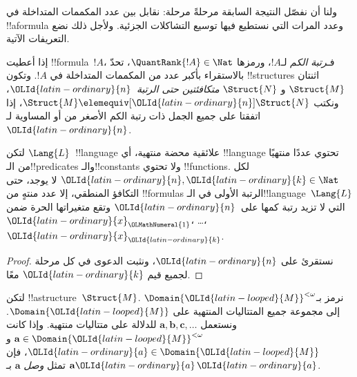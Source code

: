 \documentclass[../../../include/open-logic-section]{subfiles}
\begin{document}
ولنا أن نفصّل النتيجة السابقة مرحلةً مرحلة: نقابل بين عدد
المكممات المتداخلة في !!a{formula} وعدد المرات التي نستطيع فيها
توسيع التشاكلات الجزئية. ولأجل ذلك نضع التعريفات الآتية.

\begin{defn}
  إذا أعطيت !!{formula}~$!A$، فـ\emph{رتبة الكم} لـ$!A$، ورمزها
  $\QuantRank{!A} \in \Nat$، تحدّ بالاستقراء بأكبر عدد من المكممات
  المتداخلة في $!A$. وتكون !!{structure}s اثنتان $\Struct{M}$ و
  $\Struct{N}$ \emph{متكافئتين حتى الرتبة~${\OLId{latin-ordinary}{n}}$}، ونكتب
  $\Struct{M} \elemequiv[{\OLId{latin-ordinary}{n}}] \Struct{N}$، إذا اتفقتا على جميع الجمل ذات
  رتبة الكم الأصغر من أو المساوية لـ${\OLId{latin-ordinary}{n}}$.
\end{defn}

\begin{prop}
  لتكن $\Lang{L}$~!!{language} علائقية محضة منتهية، أي !!{language}
  تحتوي عددًا منتهيًا من الـ!!{predicate}s والـ!!{constant}s ولا تحتوي
  !!{function}s. لكل ${\OLId{latin-ordinary}{n}},{\OLId{latin-ordinary}{k}} \in \Nat$ لا يوجد، حتى التكافؤ المنطقي، إلا
  عدد منتهٍ من !!{formula}s الرتبة الأولى في الـ!!{language}~$\Lang{L}$ التي لا تزيد
  رتبة كمها على~${\OLId{latin-ordinary}{n}}$ وتقع متغيراتها الحرة ضمن ${\OLId{latin-ordinary}{x}}_{\OLMathNumeral{1}}$، \dots،~${\OLId{latin-ordinary}{x}}_{\OLId{latin-ordinary}{k}}$.
\end{prop}

\begin{proof}
  نستقرئ على ${\OLId{latin-ordinary}{n}}$، ونثبت الدعوى في كل مرحلة لجميع قيم ${\OLId{latin-ordinary}{k}}$ معًا.
\end{proof}

\begin{defn}
  لتكن !!a{structure}~$\Struct{M}$. نرمز بـ$\Domain {\OLId{latin-looped}{M}}^{<\omega}$ إلى
  مجموعة جميع المتتاليات المنتهية على $\Domain{{\OLId{latin-looped}{M}}}$. ونستعمل
  $\mathbf{a}, \mathbf{b}, \mathbf{c}, \ldots$ للدلالة على متتاليات
  منتهية. وإذا كانت $\mathbf{a} \in \Domain{{\OLId{latin-looped}{M}}}^{<\omega}$ و
  ${\OLId{latin-ordinary}{a}} \in \Domain{{\OLId{latin-looped}{M}}}$، فإن $\mathbf{a}{\OLId{latin-ordinary}{a}}$ تمثل \emph{وصل}
  $\mathbf{a}$ بـ${\OLId{latin-ordinary}{a}}$.
\end{defn}
\end{document}
